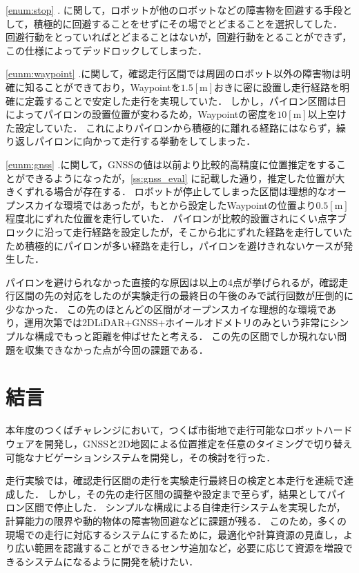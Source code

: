 \documentclass[platex,dvipdfmx]{rbproceedings}
\begin{document}
\ref{enum:stop} . に関して，ロボットが他のロボットなどの障害物を回避する手段として，積極的に回避することをせずにその場でとどまることを選択してした．
回避行動をとっていればとどまることはないが，回避行動をとることができず，この仕様によってデッドロックしてしまった．

\ref{eunm:waypoint} .に関して，確認走行区間では周囲のロボット以外の障害物は明確に知ることができており，Waypointを$1.5[ \mathrm{m}]$おきに密に設置し走行経路を明確に定義することで安定した走行を実現していた．
しかし，パイロン区間は日によってパイロンの設置位置が変わるため，Waypointの密度を$10[ \mathrm{m}]$以上空けた設定していた．
これによりパイロンから積極的に離れる経路にはならず，繰り返しパイロンに向かって走行する挙動をしてしまった．

\ref{eunm:gnss} .に関して，GNSSの値は以前より比較的高精度に位置推定をすることができるようになったが，\ref{ss:gnss_eval} に記載した通り，推定した位置が大きくずれる場合が存在する．
ロボットが停止してしまった区間は理想的なオープンスカイな環境ではあったが，もとから設定したWaypointの位置より$0.5[ \mathrm{m}]$程度北にずれた位置を走行していた．
パイロンが比較的設置されにくい点字ブロックに沿って走行経路を設定したが，そこから北にずれた経路を走行していたため積極的にパイロンが多い経路を走行し，パイロンを避けきれないケースが発生した．

パイロンを避けられなかった直接的な原因は以上の4点が挙げられるが，確認走行区間の先の対応をしたのが実験走行の最終日の午後のみで試行回数が圧倒的に少なかった．
この先のほとんどの区間がオープンスカイな理想的な環境であり，運用次第では2DLiDAR+GNSS+ホイールオドメトリのみという非常にシンプルな構成でもっと距離を伸ばせたと考える．
この先の区間でしか現れない問題を収集できなかった点が今回の課題である．

\section{結言}
本年度のつくばチャレンジにおいて，つくば市街地で走行可能なロボットハードウェアを開発し，GNSSと2D地図による位置推定を任意のタイミングで切り替え可能なナビゲーションシステムを開発し，その検討を行った．

走行実験では，確認走行区間の走行を実験走行最終日の検定と本走行を連続で達成した．
しかし，その先の走行区間の調整や設定まで至らず，結果としてパイロン区間で停止した．
シンプルな構成による自律走行システムを実現したが，計算能力の限界や動的物体の障害物回避などに課題が残る．
このため，多くの現場での走行に対応するシステムにするために，最適化や計算資源の見直し，より広い範囲を認識することができるセンサ追加など，必要に応じて資源を増設できるシステムになるように開発を続けたい．
\end{document}
